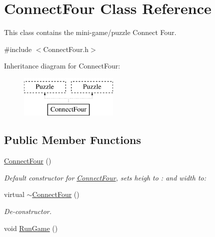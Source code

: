 \hypertarget{classConnectFour}{\section{Connect\-Four Class Reference}
\label{classConnectFour}
}


This class contains the mini-\/game/puzzle Connect Four.  




{\ttfamily \#include $<$Connect\-Four.\-h$>$}

Inheritance diagram for Connect\-Four\-:\begin{figure}[H]
\begin{center}
\leavevmode
\includegraphics[height=2.000000cm]{classConnectFour}
\end{center}
\end{figure}
\subsection*{Public Member Functions}
\begin{DoxyCompactItemize}
\item 
\hyperlink{classConnectFour_a9d7a0db424f22513386fa60ed2d5b575}{Connect\-Four} ()
\begin{DoxyCompactList}\small\item\em Default constructor for \hyperlink{classConnectFour}{Connect\-Four}, sets heigh to \-: and width to\-: \end{DoxyCompactList}\item 
virtual \hyperlink{classConnectFour_ae7d414d7f7f694fd427bfeaef80bd1f9}{$\sim$\-Connect\-Four} ()
\begin{DoxyCompactList}\small\item\em De-\/constructor. \end{DoxyCompactList}\item 
void \hyperlink{classConnectFour_a1e58549ad7980f6a1311c92f5e67e62c}{Run\-Game} ()
\end{DoxyCompactItemize}
